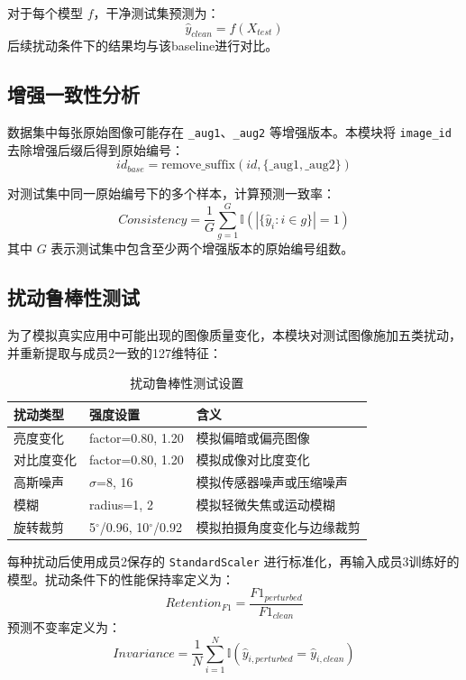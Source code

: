 \documentclass[12pt,a4paper]{ctexart}
\begin{document}
对于每个模型 $f$，干净测试集预测为：
\begin{equation}
    \hat{y}_{clean} = f(X_{test})
\end{equation}
后续扰动条件下的结果均与该baseline进行对比。

\subsection{增强一致性分析}
数据集中每张原始图像可能存在 \texttt{\_aug1}、\texttt{\_aug2} 等增强版本。本模块将 \texttt{image\_id} 去除增强后缀后得到原始编号：
\begin{equation}
    id_{base} = \text{remove\_suffix}(id, \{\text{\_aug1}, \text{\_aug2}\})
\end{equation}

对测试集中同一原始编号下的多个样本，计算预测一致率：
\begin{equation}
    Consistency = \frac{1}{G} \sum_{g=1}^{G} \mathbb{I}\left(\left|\{\hat{y}_i: i \in g\}\right| = 1\right)
\end{equation}
其中 $G$ 表示测试集中包含至少两个增强版本的原始编号组数。

\subsection{扰动鲁棒性测试}
为了模拟真实应用中可能出现的图像质量变化，本模块对测试图像施加五类扰动，并重新提取与成员2一致的127维特征：
\begin{table}[H]
\centering
\caption{扰动鲁棒性测试设置}
\label{tab:perturb_settings}
\begin{tabular}{lll}
\toprule
\textbf{扰动类型} & \textbf{强度设置} & \textbf{含义} \\
\midrule
亮度变化 & factor=0.80, 1.20 & 模拟偏暗或偏亮图像 \\
对比度变化 & factor=0.80, 1.20 & 模拟成像对比度变化 \\
高斯噪声 & $\sigma$=8, 16 & 模拟传感器噪声或压缩噪声 \\
模糊 & radius=1, 2 & 模拟轻微失焦或运动模糊 \\
旋转裁剪 & 5$^\circ$/0.96, 10$^\circ$/0.92 & 模拟拍摄角度变化与边缘裁剪 \\
\bottomrule
\end{tabular}
\end{table}

每种扰动后使用成员2保存的 \texttt{StandardScaler} 进行标准化，再输入成员3训练好的模型。扰动条件下的性能保持率定义为：
\begin{equation}
    Retention_{F1} = \frac{F1_{perturbed}}{F1_{clean}}
\end{equation}
预测不变率定义为：
\begin{equation}
    Invariance = \frac{1}{N}\sum_{i=1}^{N}\mathbb{I}(\hat{y}_{i,perturbed}=\hat{y}_{i,clean})
\end{equation}
\end{document}
